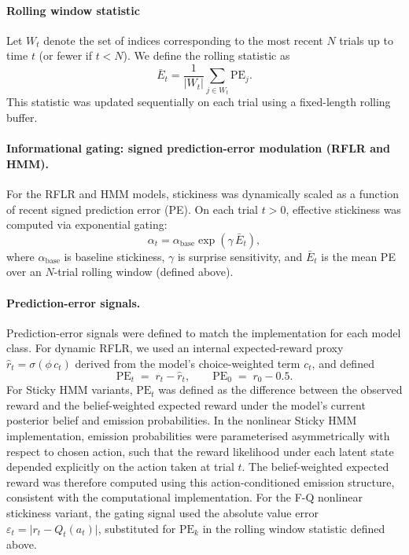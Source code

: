 \documentclass[11pt, reprint, aps, prl]{revtex4-2}
\begin{document}
\paragraph{Rolling window statistic}
Let $W_t$ denote the set of indices corresponding to the most recent $N$ trials up to time $t$ (or fewer if $t<N$).
We define the rolling statistic as
\begin{equation}
\bar{E}_t = \frac{1}{|W_t|}\sum_{j\in W_t} \mathrm{PE}_j.
\end{equation}
This statistic was updated sequentially on each trial using a fixed-length rolling buffer.
\paragraph{\textbf{Informational gating: signed prediction-error modulation (RFLR and HMM).}}
For the RFLR and HMM models, stickiness was dynamically scaled as a function of recent signed prediction error (PE).
On each trial $t>0$, effective stickiness was computed via exponential gating:
\begin{equation}
\alpha_t = \alpha_{\text{base}} \exp\!\left(\gamma \, \bar{E}_t\right),
\end{equation}
where $\alpha_{\text{base}}$ is baseline stickiness, $\gamma$ is surprise sensitivity, and $\bar{E}_t$ is the mean PE over an $N$-trial rolling window (defined above).

\paragraph{Prediction-error signals.}
Prediction-error signals were defined to match the implementation for each model class. 
For dynamic RFLR, we used an internal expected-reward proxy $\hat r_t=\sigma(\phi\,c_t)$ derived from the model's choice-weighted term $c_t$, and defined
\begin{equation}
\mathrm{PE}_t \;=\; r_t - \hat r_t,
\qquad \mathrm{PE}_0 \;=\; r_0 - 0.5.
\end{equation}
For Sticky HMM variants, $\mathrm{PE}_t$ was defined as the difference between the observed reward and the belief-weighted expected reward under the model's current posterior belief and emission probabilities. In the nonlinear Sticky HMM implementation, emission probabilities were parameterised asymmetrically with respect to chosen action, such that the reward likelihood under each latent state depended explicitly on the action taken at trial $t$. The belief-weighted expected reward was therefore computed using this action-conditioned emission structure, consistent with the computational implementation.
For the F-Q nonlinear stickiness variant, the gating signal used the absolute value error $\varepsilon_t = \lvert r_t - Q_t(a_t)\rvert$, substituted for $\mathrm{PE}_k$ in the rolling window statistic defined above.
\end{document}
